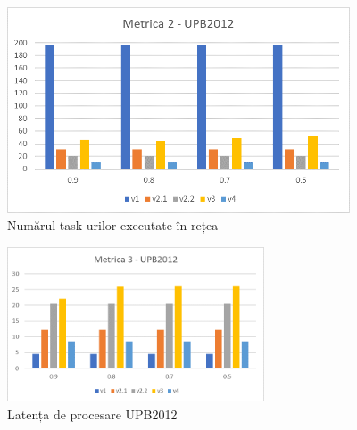 \documentclass[12pt,a4paper]{report}
\begin{document}
\iftrue
\begin{figure}[th]
\centering
\includegraphics[width=4in]{pics/graphics/grafic12.png}
  \caption[]{Numărul task-urilor executate în rețea}
  \label{grafic12}
\end{figure}
\fi

\iftrue
\begin{figure}[th]
\centering
\includegraphics[width=3in]{pics/graphics/grafic13.png}
  \caption[]{Latența de procesare UPB2012}
  \label{grafic13}
\end{figure}
\fi
\end{document}
